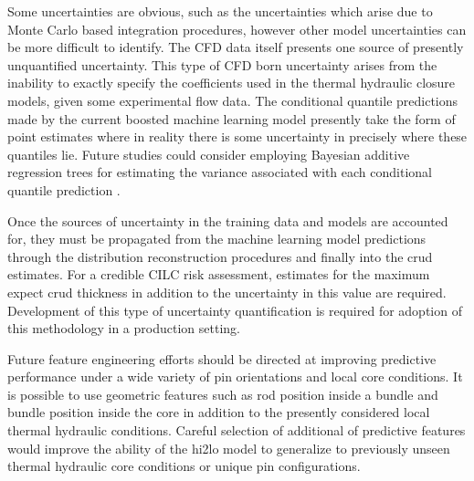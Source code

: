 Some uncertainties are obvious, such as the uncertainties which arise due to Monte Carlo based integration procedures, however other model uncertainties can be more difficult to identify.  The CFD data itself presents one source of presently unquantified uncertainty.  This type of CFD born uncertainty arises from the inability to exactly specify the coefficients used in the thermal hydraulic closure models, given some experimental flow data.  The conditional quantile predictions made by the current boosted machine learning model presently take the form of point estimates where in reality there is some uncertainty in precisely where these quantiles lie.  Future studies could consider employing Bayesian additive regression trees for estimating the variance associated with each conditional quantile prediction \cite{chipman2010}.

    
Once the sources of uncertainty in the training data and models are accounted for, they must be propagated from the machine learning model predictions through the distribution reconstruction procedures and finally into the crud estimates.  For a credible CILC risk assessment, estimates for the maximum expect crud thickness in addition to the uncertainty in this value are required. Development of this type of uncertainty quantification is required for adoption of this methodology in a production setting.

Future feature engineering efforts should be directed at improving predictive performance under a wide variety of pin orientations and local core conditions.  It is possible to use geometric features such as rod position inside a bundle and bundle position inside the core in addition to the presently considered local thermal hydraulic conditions.  Careful selection of additional of predictive features would improve the ability of the hi2lo model to generalize to previously unseen thermal hydraulic core conditions or unique pin configurations.
	
	
